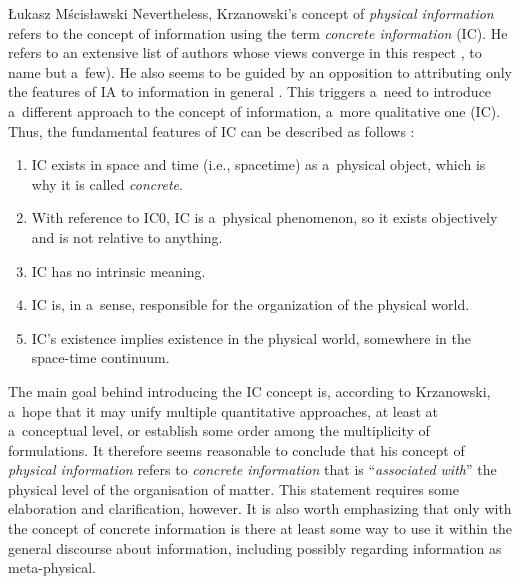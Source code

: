 \begin{artengenv}{Łukasz Mścisławski}
Nevertheless, Krzanowski's concept of \textit{physical information} refers to the concept of information using the term \textit{concrete information} (IC). He refers to an extensive list of authors whose views converge in this respect
\parencites[e.g.,][]{turek_filozoficzne_1978}[von][]{von_weizsacker_einheit_1982}[][]{nagel_mind_2012}[][]{dodig-crnkovic_alan_2013}[][]{heller_elementy_2014}[][]{rovelli_meaning_2016}[][]{wilczek_beautiful_2016}[][]{davies_demon_2020}, %
 to name but a~few). He also seems to be guided by an opposition to attributing only the features of IA to information in general 
\parencites[cf.][]{krzanowski_does_2020}[][]{krzanowski_why_2020}. %
 This triggers a~need to introduce a~different approach to the concept of information, a~more qualitative one (IC). Thus, the fundamental features of IC can be described as follows 
\parencite[cf.][p.2]{krzanowski_what_2020}:%
\begin{enumerate}[label=(IC\arabic*), start=0]
\item IC exists in space and time (i.e., spacetime) as a~physical object, which is why it is called \textit{concrete}.
\item With reference to IC0, IC is a~physical phenomenon, so it exists objectively and is not relative to anything.
\item IC has no intrinsic meaning.
\item IC is, in a~sense, responsible for the organization of the physical world.
\item IC's existence implies existence in the physical world, somewhere in the space-time continuum.
\end{enumerate}

The main goal behind introducing the IC concept is, according to Krzanowski, a~hope that it may unify multiple quantitative approaches, at least at a~conceptual level, or establish some order among the multiplicity of formulations. It therefore seems reasonable to conclude that his concept of \textit{physical information} refers to \textit{concrete information} that is ``\textit{associated with}'' the physical level of the organisation of matter. This statement requires some elaboration and clarification, however. It is also worth emphasizing that only with the concept of concrete information is there at least some way to use it within the general discourse about information, including possibly regarding information as meta-physical.


\end{artengenv}

